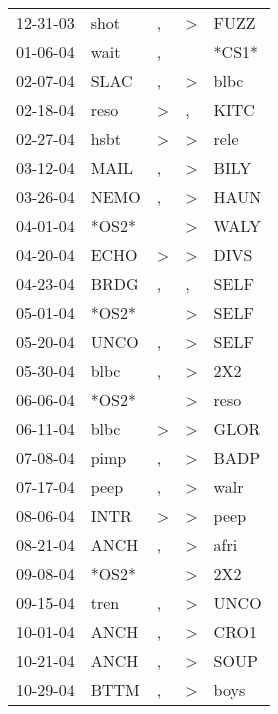 \begin{supertabular}{lllll}
 12-31-03 &   shot &                , &     \textgreater &   FUZZ \\
 01-06-04 &   wait &                , &                  &  *CS1* \\
 02-07-04 &   SLAC &                , &     \textgreater &   blbc \\
 02-18-04 &   reso &     \textgreater &                , &   KITC \\
 02-27-04 &   hsbt &     \textgreater &     \textgreater &   rele \\
 03-12-04 &   MAIL &                , &     \textgreater &   BILY \\
 03-26-04 &   NEMO &                , &     \textgreater &   HAUN \\
 04-01-04 &  *OS2* &                  &     \textgreater &   WALY \\
 04-20-04 &   ECHO &     \textgreater &     \textgreater &   DIVS \\
 04-23-04 &   BRDG &                , &                , &   SELF \\
 05-01-04 &  *OS2* &                  &     \textgreater &   SELF \\
 05-20-04 &   UNCO &                , &     \textgreater &   SELF \\
 05-30-04 &   blbc &                , &     \textgreater &    2X2 \\
 06-06-04 &  *OS2* &                  &     \textgreater &   reso \\
 06-11-04 &   blbc &     \textgreater &     \textgreater &   GLOR \\
 07-08-04 &   pimp &                , &     \textgreater &   BADP \\
 07-17-04 &   peep &                , &     \textgreater &   walr \\
 08-06-04 &   INTR &     \textgreater &     \textgreater &   peep \\
 08-21-04 &   ANCH &                , &     \textgreater &   afri \\
 09-08-04 &  *OS2* &                  &     \textgreater &    2X2 \\
 09-15-04 &   tren &                , &     \textgreater &   UNCO \\
 10-01-04 &   ANCH &                , &     \textgreater &   CRO1 \\
 10-21-04 &   ANCH &                , &     \textgreater &   SOUP \\
 10-29-04 &   BTTM &                , &     \textgreater &   boys \\

\end{supertabular}
